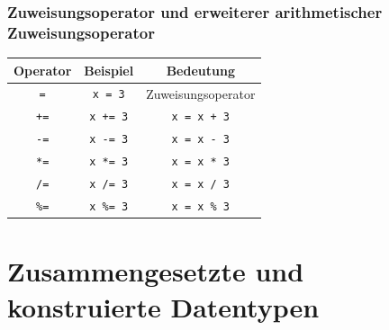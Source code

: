 \documentclass[a4paper]{report}
\begin{document}
\subsubsection{Zuweisungsoperator und erweiterer arithmetischer Zuweisungsoperator}
\begin{center}
	\begin{tabular}{|c|c|c|} \hline
		\textbf{Operator} &	\textbf{Beispiel} & \textbf{Bedeutung} \\ \hline
		\texttt{=} & \texttt{x = 3} & Zuweisungsoperator \\ \hline
		\texttt{+=} & \texttt{x += 3} & \texttt{x = x + 3} \\ \hline
		\texttt{-=} & \texttt{x -= 3} & \texttt{x = x - 3} \\ \hline
		\texttt{*=} & \texttt{x *= 3} & \texttt{x = x * 3} \\ \hline
		\texttt{/=} & \texttt{x /= 3} & \texttt{x = x / 3} \\ \hline
		\texttt{\%=} & \texttt{x \%= 3} & \texttt{x = x \% 3} \\ \hline	

	\end{tabular}
\end{center}

\section{Zusammengesetzte und konstruierte Datentypen}
\end{document}
